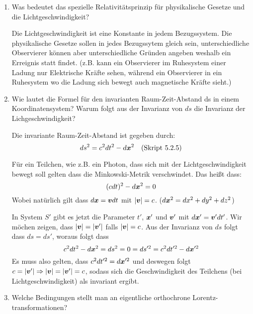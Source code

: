 \begin{enumerate}
  \item Was bedeutet das spezielle Relativitätsprinzip für physikalische %
    Gesetze und die Lichtgeschwindigkeit?

    Die Lichtgeschwindigkeit ist eine Konstante in jedem Bezugssystem.
    Die physikalische Gesetze sollen in jedes Bezugssytem gleich sein,
    unterschiedliche Observierer können aber unterschiedliche Gründen
    angeben weshalb ein Erreignis statt findet. (z.B. kann ein Observierer
    im Ruhesystem einer Ladung nur Elektrische Kräfte sehen, während
    ein Observierer in ein Ruhesystem wo die Ladung sich bewegt auch
    magnetische Kräfte sieht.) 

  \item Wie lautet die Formel für den invarianten Raum-Zeit-Abstand ds in %
    einem Koordinatensystem? Warum folgt aus der Invarianz von $ds$ die
    Invarianz der Lichgeschwindigkeit?
    
    Die invariante Raum-Zeit-Abstand ist gegeben durch:
    \begin{equation*}
      ds^2 = c^2 dt^2 - d\vb* x^2
      \quad\text{(Skript 5.2.5)}
    \end{equation*}

      Für ein Teilchen, wie z.B. ein Photon, dass sich mit der 
      Lichtgeschwindigkeit bewegt soll gelten dass die Minkowski-Metrik
      verschwindet. Das heißt dass:
      \begin{equation*}
        (cdt)^2 - d\vb* x^2 = 0 
      \end{equation*}
      Wobei natürlich gilt dass $d\vb* x=\vb* vdt$ mit $\abs{\vb* v}=c$.
      ($d\vb* x^2 = dx^2 + dy^2 + dz^2$)

      In System $S'$ gibt es jetzt die Parameter $t'$, $\vb* x'$ und $\vb* v'$
      mit $d\vb* x'=\vb* v'dt'$. Wir möchen zeigen, dass 
      $\abs{\vb* v}=\abs{\vb* v'}$ falls $\abs{\vb* v}=c$.
      Aus der Invarianz von $ds$ folgt dass $ds=ds'$, woraus folgt dass
      \begin{equation*}
        c^2dt^2-d\vb* x^2 = ds^2 = 0 = ds'^2 = c^2dt'^2 - d\vb* x'^2
      \end{equation*}
      Es muss also gelten, dass $c^2dt'^2 = d\vb* x'^2$ und deswegen folgt
      $c=\abs{\vb* v'}\Rightarrow \abs{\vb* v}=\abs{\vb* v'}=c$, 
      sodass sich die Geschwindigkeit 
      des Teilchens (bei Lichtgeschwindigkeit) als invariant ergibt.

  \item Welche Bedingungen stellt man an eigentliche orthochrone %
    Lorentz-transformationen?


\end{enumerate}
